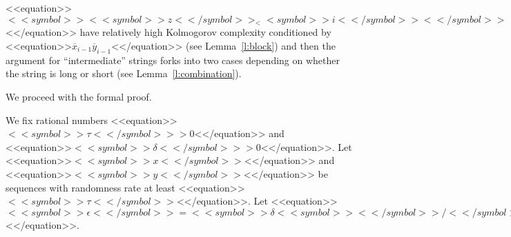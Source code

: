 \documentclass[proceedings]{stacs}
\newcommand{\barx}{\overline{x}}
\newcommand{\bary}{\overline{y}}
\begin{document}
<<equation>>$<<symbol>><<symbol>>z<</symbol>>_<<symbol>>i<</symbol>><</symbol>>$<</equation>> have relatively high Kolmogorov complexity conditioned by <<equation>>$\barx_{i-1} \bary_{i-1}$<</equation>> (see Lemma~\ref{l:block}) and then the argument for ``intermediate'' strings  forks into two cases depending on whether the string is long or short (see Lemma~\ref{l:combination}).

We proceed with the formal proof.

We fix rational numbers <<equation>>$<<symbol>>\tau <</symbol>>> 0$<</equation>> and <<equation>>$<<symbol>>\delta <</symbol>>> 0$<</equation>>.
Let <<equation>>$<<symbol>>x<</symbol>>$<</equation>> and <<equation>>$<<symbol>>y<</symbol>>$<</equation>> be sequences with randomness rate at least <<equation>>$<<symbol>>\tau<</symbol>>$<</equation>>.
Let <<equation>>$<<symbol>>\epsilon <</symbol>>= <<symbol>>\delta<<symbol>><</symbol>>/<</symbol>>4$<</equation>>. 
\end{document}
